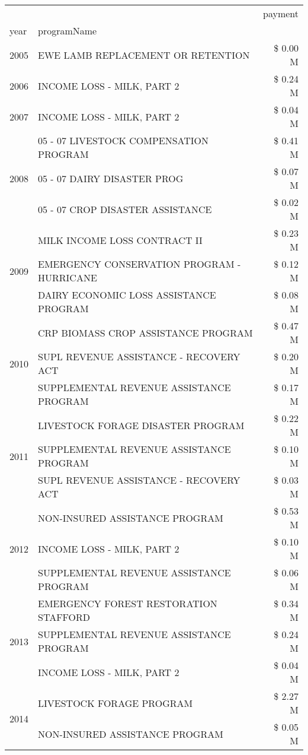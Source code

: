 \begin{tabular}{llr}
\toprule
 &  & payment \\
year & programName &  \\
\midrule
2005 & EWE LAMB REPLACEMENT OR RETENTION & \$ 0.00 M \\
\cline{1-3}
2006 & INCOME LOSS - MILK, PART 2 & \$ 0.24 M \\
\cline{1-3}
2007 & INCOME LOSS - MILK, PART 2 & \$ 0.04 M \\
\cline{1-3}
\multirow[t]{3}{*}{2008} & 05 - 07 LIVESTOCK COMPENSATION PROGRAM & \$ 0.41 M \\
 & 05 - 07 DAIRY DISASTER PROG & \$ 0.07 M \\
 & 05 - 07 CROP DISASTER ASSISTANCE & \$ 0.02 M \\
\cline{1-3}
\multirow[t]{3}{*}{2009} & MILK INCOME LOSS CONTRACT II & \$ 0.23 M \\
 & EMERGENCY CONSERVATION PROGRAM - HURRICANE & \$ 0.12 M \\
 & DAIRY ECONOMIC LOSS ASSISTANCE PROGRAM & \$ 0.08 M \\
\cline{1-3}
\multirow[t]{3}{*}{2010} & CRP BIOMASS CROP ASSISTANCE PROGRAM & \$ 0.47 M \\
 & SUPL REVENUE ASSISTANCE - RECOVERY ACT & \$ 0.20 M \\
 & SUPPLEMENTAL REVENUE ASSISTANCE PROGRAM & \$ 0.17 M \\
\cline{1-3}
\multirow[t]{3}{*}{2011} & LIVESTOCK FORAGE DISASTER PROGRAM & \$ 0.22 M \\
 & SUPPLEMENTAL REVENUE ASSISTANCE PROGRAM & \$ 0.10 M \\
 & SUPL REVENUE ASSISTANCE - RECOVERY ACT & \$ 0.03 M \\
\cline{1-3}
\multirow[t]{3}{*}{2012} & NON-INSURED ASSISTANCE PROGRAM & \$ 0.53 M \\
 & INCOME LOSS - MILK, PART 2 & \$ 0.10 M \\
 & SUPPLEMENTAL REVENUE ASSISTANCE PROGRAM & \$ 0.06 M \\
\cline{1-3}
\multirow[t]{3}{*}{2013} & EMERGENCY FOREST RESTORATION STAFFORD & \$ 0.34 M \\
 & SUPPLEMENTAL REVENUE ASSISTANCE PROGRAM & \$ 0.24 M \\
 & INCOME LOSS - MILK, PART 2 & \$ 0.04 M \\
\cline{1-3}
\multirow[t]{3}{*}{2014} & LIVESTOCK FORAGE PROGRAM & \$ 2.27 M \\
 & NON-INSURED ASSISTANCE PROGRAM & \$ 0.05 M \\

\end{tabular}
